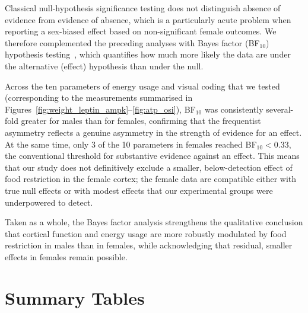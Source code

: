 \documentclass[11pt]{article}
\begin{document}
Classical null-hypothesis significance testing does not distinguish absence of evidence from evidence of absence, which is a particularly acute problem when reporting a sex-biased effect based on non-significant female outcomes. We therefore complemented the preceding analyses with Bayes factor (BF$_{10}$) hypothesis testing~\citep{sekulovski2024bayes}, which quantifies how much more likely the data are under the alternative (effect) hypothesis than under the null.

Across the ten parameters of energy usage and visual coding that we tested (corresponding to the measurements summarised in Figures~\ref{fig:weight_leptin_ampk}--\ref{fig:atp_osi}), BF$_{10}$ was consistently several-fold greater for males than for females, confirming that the frequentist asymmetry reflects a genuine asymmetry in the strength of evidence for an effect. At the same time, only 3 of the 10 parameters in females reached BF$_{10} < 0.33$, the conventional threshold for substantive evidence against an effect. This means that our study does not definitively exclude a smaller, below-detection effect of food restriction in the female cortex; the female data are compatible either with true null effects or with modest effects that our experimental groups were underpowered to detect.

Taken as a whole, the Bayes factor analysis strengthens the qualitative conclusion that cortical function and energy usage are more robustly modulated by food restriction in males than in females, while acknowledging that residual, smaller effects in females remain possible.

\section{Summary Tables}
\end{document}
